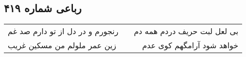\begin{center}
\section*{رباعی شماره ۴۱۹}
\label{sec:sh419}
\begin{longtable}{l p{0.5cm} r}
رنجورم و در دل از تو دارم صد غم
&&
بی لعل لبت حریف دردم همه دم
\\
زین عمر ملولم من مسکین غریب
&&
خواهد شود آرامگهم کوی عدم
\\
\end{longtable}
\end{center}
